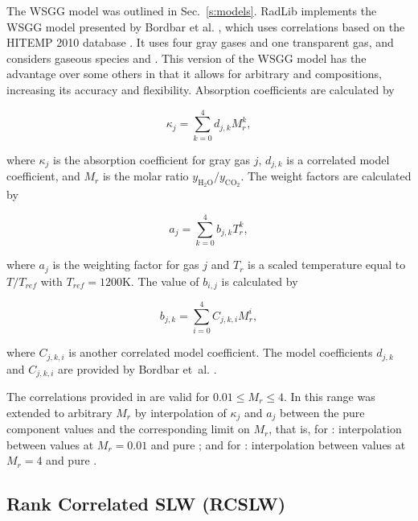 \documentclass[preprint,12pt, a4paper]{elsarticle}
\begin{document}
The WSGG model was outlined in Sec.~\ref{s:models}.
RadLib implements the WSGG model presented by Bordbar et al. \citep{Bordbar_2014,Bordbar_2020}, which uses correlations based on the HITEMP 2010 database \cite{Rothman_2010}. It uses four gray gases and one transparent gas, and considers gaseous species  and . This version of the WSGG model has the advantage over some others in that it allows for arbitrary  and  compositions, increasing its accuracy and flexibility. Absorption coefficients are calculated by 
%
\begin{linenomath}
\begin{equation}
    \kappa_j=\sum_{k=0}^{4}d_{j,k}M_r^k,
\end{equation}
\end{linenomath}
%
where $\kappa_j$ is the absorption coefficient for gray gas $j$, $d_{j,k}$ is a correlated model coefficient, and $M_r$ is the molar ratio $y_{\mathrm{H_2O}}/y_{\mathrm{CO_2}}$. The weight factors are calculated by 
%
\begin{linenomath}
\begin{equation}
    a_j=\sum_{k=0}^{4}b_{j,k}T_r^k,
\end{equation}
\end{linenomath}
%
where $a_j$ is the weighting factor for gas $j$ and $T_r$ is a scaled temperature equal to $T/T_{ref}$ with $T_{ref}=1200$K. The value of $b_{i,j}$ is calculated by 
%
\begin{linenomath}
\begin{equation}
 b_{j,k}=\sum_{i=0}^{4}C_{j,k,i}M_r^i,
\end{equation}
\end{linenomath}
%
where $C_{j,k,i}$ is another correlated model coefficient. The model coefficients $d_{j,k}$ and $C_{j,k,i}$ are provided by Bordbar et~al. \citep{Bordbar_2014,Bordbar_2020}. 

The correlations provided in \cite{Bordbar_2014} are valid for $0.01\le M_r\le4$. In \cite{Bordbar_2020} this range was extended to arbitrary $M_r$ by interpolation of $\kappa_j$ and $a_j$ between the pure component values and the corresponding limit on $M_r$, that is, for : interpolation between values at $M_r=0.01$ and pure ; and for : interpolation between values at $M_r=4$ and pure .


\subsection{Rank Correlated SLW (RCSLW)} \label{s:RCSLW}
\end{document}
